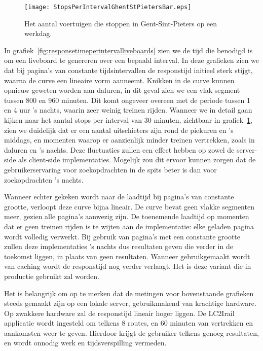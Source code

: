 \begin{figure}[h]
	\centering
	\texttt{[image: StopsPerIntervalGhentStPietersBar.eps]}
	\caption[Het aantal voertuigen die stoppen in Gent-St-Pieters]{Het aantal voertuigen die stoppen in Gent-Sint-Pieters op een werkdag.}
	\label{fig:stopsperintervaldetail}
\end{figure}

In grafiek~\ref{fig:responsetimeperintervalliveboards} zien we de tijd die benodigd is om een liveboard te genereren over een bepaald interval. In deze grafieken zien we dat bij pagina's van constante tijdsintervallen de responstijd initieel sterk stijgt, waarna de curve een lineaire vorm aanneemt. Knikken in de curve kunnen opnieuw geweten worden aan daluren, in dit geval zien we een vlak segment tussen 800 en 960 minuten. Dit komt ongeveer overeen met de periode tussen 1 en 4 uur 's nachts, waarin zeer weinig treinen rijden. Wanneer we in detail gaan kijken naar het aantal stops per interval van 30 minuten, zichtbaar in grafiek~\ref{fig:stopsperintervaldetail}, zien we duidelijk dat er een aantal uitschieters zijn rond de piekuren en 's middags, en momenten waarop er aanzienlijk minder treinen vertrekken, zoals in daluren en 's nachts. Deze fluctuaties zullen een effect hebben op zowel de server-side als client-side implementaties. Mogelijk zou dit ervoor kunnen zorgen dat de gebruikerservaring voor zoekopdrachten in de spits beter is dan voor zoekopdrachten 's nachts.

Wanneer echter gekeken wordt naar de laadtijd bij pagina's van constante grootte, verloopt deze curve bijna lineair. De curve bevat geen vlakke segmenten meer, gezien alle pagina's aanwezig zijn. De toenemende laadtijd op momenten dat er geen treinen rijden is te wijten aan de implementatie: elke geladen pagina wordt volledig verwerkt. Bij gebruik van pagina's met een constante grootte zullen deze implementaties 's nachts dus resultaten geven die verder in de toekomst liggen, in plaats van geen resultaten. Wanneer gebruikgemaakt wordt van caching wordt de responstijd nog verder verlaagt. Het is deze variant die in productie gebruikt zal worden. 

Het is belangrijk om op te merken dat de metingen voor bovenstaande grafieken steeds gemaakt zijn op een lokale server, gebruikmakend van krachtige hardware. Op zwakkere hardware zal de responstijd lineair hoger liggen. De LC2Irail applicatie wordt ingesteld om telkens 8 routes, en 60 minuten van vertrekken en aankomsten weer te geven. Hierdoor krijgt de gebruiker telkens genoeg resultaten, en wordt onnodig werk en tijdsverspilling vermeden.

